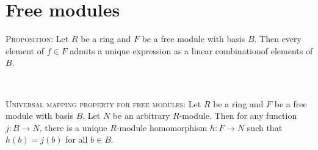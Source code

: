 \documentclass[12pt]{amsart}
\newcommand{\showsol}[1]{\def\displaysol{#1}}
\begin{document}
\showsol{0}
	
	\thispagestyle{empty}
	
	\section*{Free modules}
	
	

\begin{framed}
\textsc{Proposition:} Let $R$ be a ring and $F$ be a free module with basis $B$. Then every element of $f\in F$ admits a unique expression as a linear combination\footnotemark[1] of elements of $B$.

\

\textsc{Universal mapping property for free modules:} Let $R$ be a ring and $F$ be a free module with basis $B$. Let $N$ be an arbitrary $R$-module. Then for any function $j:B\to N$, there is a unique $R$-module homomorphism $h:F\to N$ such that $h(b) = j(b)$ for all $b\in B$.
\end{framed}
\end{document}
